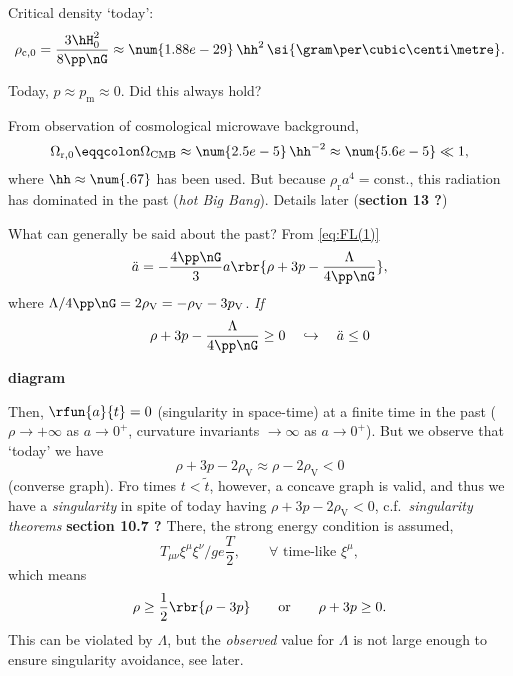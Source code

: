 Critical density `today':
\begin{equation}
\rho_{\text{c}, 0}  = \frac{3\hH_0^2}{8\pp\nG} \approx 
\num{1.88e-29}\,\hh^2\,\si{\gram\per\cubic\centi\metre}.
\end{equation}

Today, $p \approx p_\text{m} \approx 0$. Did this always hold?

From observation of cosmological microwave background,
\begin{equation}
\Omega_{\text{r}, 0} \eqqcolon \Omega_\text{CMB} \approx \num{2.5e-5}\,\hh^{-2} 
\approx \num{5.6e-5} \ll 1,
\end{equation}
where $\hh\approx \num{.67}$ has been used. But because $\rho_\text{r} a^4 = 
\text{const.}$, this radiation has dominated in the past (\emph{hot Big Bang}). 
Details later (\textbf{section 13 ?})

What can generally be said about the past? From \cref{eq:FL(1)}
\begin{equation}
 \ddot{a} = -\frac{4\pp\nG}{3} a \rbr{\rho + 3p - \frac{\Lambda}{4\pp\nG}},
\end{equation}
where ${\Lambda}/{4\pp\nG} = 2\rho_\text{V} = -\rho_\text{V} - 3p_\text{V}$. 
\emph{If}
\begin{equation}
\rho + 3p - \frac{\Lambda}{4\pp\nG} \ge 0\quad\hookrightarrow\quad 
\ddot{a} \le 0
\end{equation}

\textbf{diagram}

Then, $\rfun{a}{t} = 0$ (singularity in space-time) at a finite time in the 
past ($\rho \to +\infty$ as $a \to 0^+$, curvature invariants $\to \infty$ as 
$a \to 0^+$). But we observe that `today' we have
\begin{equation}
 \rho + 3p - 2\rho_\text{V} \approx \rho - 2\rho_\text{V} < 0
\end{equation}
(converse graph). Fro times $t < \tilde{t}$, however, a concave graph is valid, 
and thus we have a \emph{singularity} in spite of today having $\rho + 3p - 
2\rho_\text{V} < 0$, c.f.\ \emph{singularity theorems} \textbf{section 10.7 ?} 
There, the strong energy condition is assumed,
\begin{equation}
 T_{\mu\nu}\xi^\mu\xi^\nu /ge \frac{T}{2},\qquad\forall\text{ time-like 
}\xi^\mu,
\end{equation}
which means
\begin{equation}
 \rho \ge \frac{1}{2}\rbr{\rho-3p} \qquad\text{or}\qquad \rho+3p \ge 0.
\end{equation}
This can be violated by $\Lambda$, but the \emph{observed} value for $\Lambda$ 
is not large enough to ensure singularity avoidance, see later.


